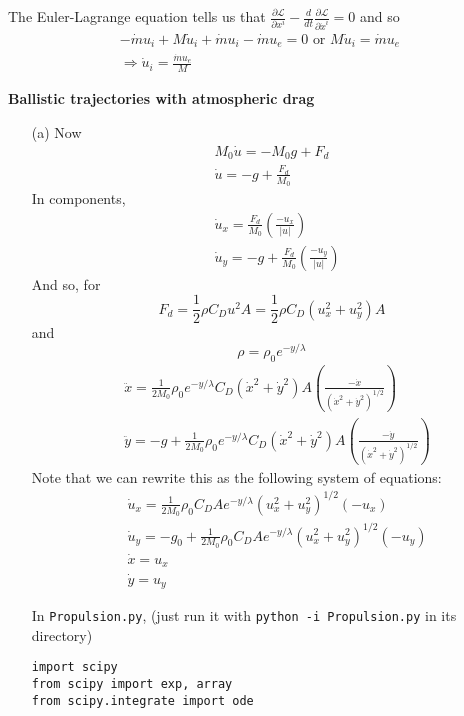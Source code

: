 \documentclass[10pt]{amsart}
\newcommand{\problemhead}[1]
  {
   \noindent{\small\bf Problem #1.}
   }
\begin{document}
\begin{multicols*}{2}
The Euler-Lagrange equation tells us that $\frac{ \partial \mathcal{L}}{ \partial x^i} - \frac{d}{dt} \frac{ \partial \mathcal{L}}{ \partial \dot{x}^i } =0$ and so 
\[
\begin{gathered}
  -\dot{m} u_i + M\dot{u}_i + \dot{m} u_i - \dot{m}u_e = 0 \text{ or } M\dot{u}_i = \dot{m} u_e \\
  \Longrightarrow \boxed{ \dot{u}_i = \frac{\dot{m} u_e }{M} }
\end{gathered}
\]


\problemhead{4} \textbf{Ballistic trajectories with atmospheric drag}

\begin{enumerate}
\item[(a)] Now 
\[
\begin{gathered}
  M_0 \dot{u}  =-M_0 g + F_d \\ 
  \dot{u} = - g + \frac{F_d}{M_0}
\end{gathered}
\]
In components, 
\[
\begin{aligned}
  & \dot{u}_x = \frac{F_d}{M_0} \left( \frac{-u_x}{|u|} \right) \\ 
  & \dot{u}_y = -g + \frac{F_d}{M_0} \left( \frac{-u_y}{|u|} \right) 
\end{aligned}
\]
And so, for 
\[
F_d = \frac{1}{2} \rho C_D u^2 A = \frac{1}{2} \rho C_D (u_x^2 + u_y^2) A
\] 
and 
\[
\rho = \rho_0 e^{-y/\lambda}
\]
\[
\begin{aligned}
  & \ddot{x} = \frac{1}{2M_0} \rho_0 e^{-y/\lambda} C_D (\dot{x}^2 + \dot{y}^2 )A \left( \frac{-\dot{x} }{ (\dot{x}^2 + \dot{y}^2 )^{1/2} } \right) \\ 
  & \ddot{y} = -g + \frac{1}{2M_0} \rho_0 e^{-y/\lambda} C_D (\dot{x}^2 + \dot{y}^2 )A \left( \frac{-\dot{y} }{ (\dot{x}^2 + \dot{y}^2 )^{1/2} } \right) 
\end{aligned}
\]
Note that we can rewrite this as the following system of equations:
\[
\begin{aligned}
  & \dot{u}_x = \frac{1}{2M_0} \rho_0 C_D A e^{-y/\lambda} (u_x^2 + u_y^2)^{1/2} (-u_x) \\ 
  & \dot{u}_y = -g_0 + \frac{1}{2M_0} \rho_0 C_D A e^{-y/\lambda} (u_x^2 + u_y^2)^{1/2} (-u_y) \\ 
  & \dot{x} = u_x \\ 
  & \dot{y} = u_y
\end{aligned}
\]

In \verb|Propulsion.py|, (just run it with \verb|python -i Propulsion.py| in its directory)
\begin{lstlisting}
import scipy
from scipy import exp, array
from scipy.integrate import ode


\end{lstlisting}
\end{enumerate}
\end{multicols*}
\end{document}
